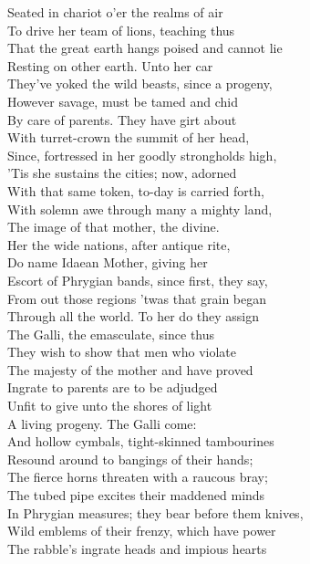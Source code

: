 Seated in chariot o'er the realms of air\\
To drive her team of lions, teaching thus\\
That the great earth hangs poised and cannot lie\\
Resting on other earth. Unto her car\\
They've yoked the wild beasts, since a progeny,\\
However savage, must be tamed and chid\\
By care of parents. They have girt about\\
With turret-crown the summit of her head,\\
Since, fortressed in her goodly strongholds high,\\
'Tis she sustains the cities; now, adorned\\
With that same token, to-day is carried forth,\\
With solemn awe through many a mighty land,\\
The image of that mother, the divine.\\
Her the wide nations, after antique rite,\\
Do name Idaean Mother, giving her\\
Escort of Phrygian bands, since first, they say,\\
From out those regions 'twas that grain began\\
Through all the world. To her do they assign\\
The Galli, the emasculate, since thus\\
They wish to show that men who violate\\
The majesty of the mother and have proved\\
Ingrate to parents are to be adjudged\\
Unfit to give unto the shores of light\\
A living progeny. The Galli come:\\
And hollow cymbals, tight-skinned tambourines\\
Resound around to bangings of their hands;\\
The fierce horns threaten with a raucous bray;\\
The tubed pipe excites their maddened minds\\
In Phrygian measures; they bear before them knives,\\
Wild emblems of their frenzy, which have power\\
The rabble's ingrate heads and impious hearts\\
